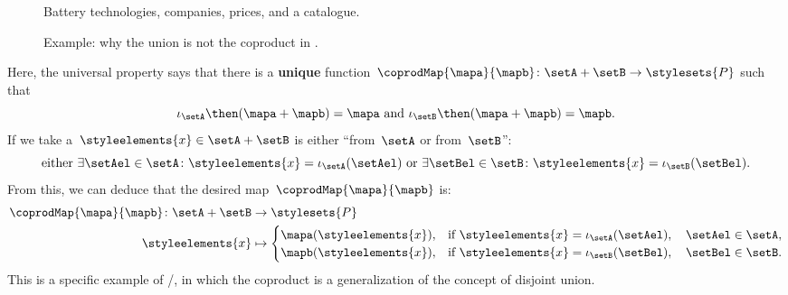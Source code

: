 \begin{example}
    \begin{figure}[tbh]
        \centering
        \caption{Battery technologies, companies, prices, and a catalogue.}
        \label{fig:coprod_batteries_1}
    \end{figure}

    \begin{figure}[tbh]
        \centering
        \caption{Example: why the union is not the coproduct in \Set.}
        \label{fig:coprod_batteries_2}
    \end{figure}


    Here, the universal property says that there is a \textbf{unique} function~$\coprodMap{\mapa}{\mapb}\colon \setA+\setB\to \stylesets{P}$ such that
    \begin{equation}
        \label{eq:exa-batt-factoring-maps}
        \iota_\setA\then (\mapa+ \mapb)=\mapa \text{ and }\iota_\setB\then (\mapa+ \mapb)=\mapb.
    \end{equation}
    If we take a~$\styleelements{x}\in \setA+\setB$ is either ``from~$\setA$ or from~$\setB$'':
    \begin{equation}
        \label{eq:exa-batt-explain-sum-map}
        \text{either } \exists \setAel\in \setA\colon \styleelements{x}=\iota_\setA(\setAel) \text{ or }\exists \setBel\in \setB\colon \styleelements{x}=\iota_\setB(\setBel).
    \end{equation}
    From this, we can deduce that the desired map~$\coprodMap{\mapa}{\mapb}$ is:
    \begin{equation}
        \label{eq:exa-batt-def-sum-map}
        \begin{aligned}
            \coprodMap{\mapa}{\mapb} \colon  \setA + \setB &\to \stylesets{P} \\
            \styleelements{x} &   \mapsto
            \begin{cases}
                \mapa(\styleelements{x}),& \text{if } \styleelements{x}=\iota_\setA(\setAel),\quad \setAel \in \setA, \\
                \mapb(\styleelements{x}),& \text{if } \styleelements{x}=\iota_\setB(\setBel),\quad \setBel \in \setB.
            \end{cases}
        \end{aligned}
    \end{equation}
    This is a specific example of \Set/\FinSet, in which the coproduct is a generalization of the concept of disjoint union.

\end{example}
